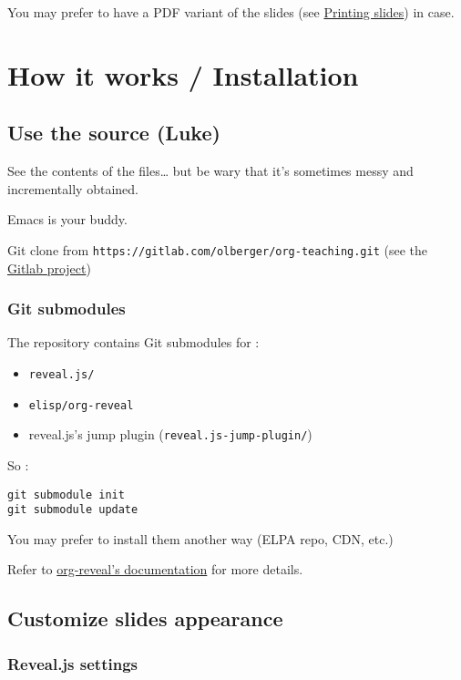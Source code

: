 \documentclass[a4paper]{article}
\begin{document}
You may prefer to have a PDF variant of the slides (see \hyperref[sec:org0fe73d3]{Printing slides}) in case.



\section{How it works / Installation}
\label{sec:orgf81a28f}
\subsection{Use the source (Luke)}
\label{sec:orgf39c694}

See the contents of the files\ldots{} but be wary that it's sometimes messy and incrementally obtained.

Emacs is your buddy.

Git clone from \texttt{https://gitlab.com/olberger/org-teaching.git} (see the \href{https://gitlab.com/olberger/org-teaching}{Gitlab project})

\subsubsection{Git submodules}
\label{sec:orgd506fc4}

The repository contains Git submodules for :
\begin{itemize}
\item \texttt{reveal.js/}
\item \texttt{elisp/org-reveal}
\item reveal.js's jump plugin (\texttt{reveal.js-jump-plugin/})
\end{itemize}

So :
\begin{verbatim}
git submodule init
git submodule update
\end{verbatim}
You may prefer to install them another way (ELPA repo, CDN, etc.)

\begin{NOTES}
Refer to \href{https://github.com/yjwen/org-reveal/\#requirements-and-installation}{org-reveal's documentation} for more details.
\end{NOTES}

\subsection{Customize slides appearance}
\label{sec:orgcc428dd}

\subsubsection{Reveal.js settings}
\label{sec:orgc9d8353}
\end{document}
